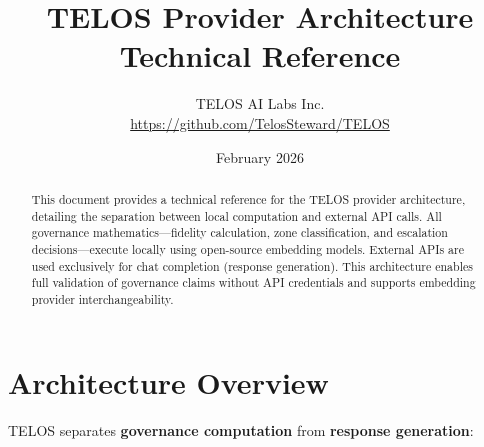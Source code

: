 \documentclass[11pt,twocolumn]{article}
\title{TELOS Provider Architecture\\Technical Reference}
\author{TELOS AI Labs Inc.\\[4pt]\url{https://github.com/TelosSteward/TELOS}}
\date{February 2026}
\begin{document}
\maketitle

\begin{abstract}
This document provides a technical reference for the TELOS provider architecture, detailing the separation between local computation and external API calls. All governance mathematics---fidelity calculation, zone classification, and escalation decisions---execute locally using open-source embedding models. External APIs are used exclusively for chat completion (response generation). This architecture enables full validation of governance claims without API credentials and supports embedding provider interchangeability.
\end{abstract}

\section{Architecture Overview}

TELOS separates \textbf{governance computation} from \textbf{response generation}:

\begin{center}
\end{center}
\end{document}
